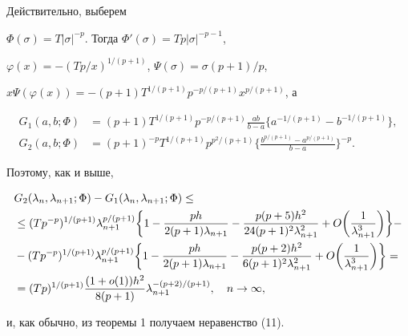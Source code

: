 Действительно, выберем


$\Phi(\sigma)=T|\sigma|^{-p}$. Тогда $\Phi'(\sigma)=Tp|\sigma|^{-p-1}$,


$\varphi(x)=-(Tp/x)^{1/(p+1)}$, $\Psi(\sigma)=\sigma(p+1)/p$, 


$x\Psi(\varphi(x))=-(p+1)T^{1/(p+1)}p^{-p/(p+1)}x^{p/(p+1)}$, а


\begin{align*}


G_1(a,b;\Phi)&=(p+1)T^{1/(p+1)}p^{-p/(p+1)}\frac{ab}{b-a}


\{a^{-1/(p+1)}-b^{-1/(p+1)}\},\\


G_2(a,b;\Phi)&=(p+1)^{-p}T^{1/(p+1)}p^{p^2/(p+1)}


\bigg\{\frac{b^{p/(p+1)}-a^{p/(p+1)}}{b-a}\bigg\}^{-p}.


\end{align*}


Поэтому, как и выше,


\begin{align}




&G_2(\lambda_n,\lambda_{n+1};\Phi)-


G_1(\lambda_n,\lambda_{n+1};\Phi)\le\notag\\


&\le (Tp^{-p})^{1/(p+1)}\lambda_{n+1}^{p/(p+1)}


\bigg\{1-\frac{ph}{2(p+1)\lambda_{n+1}}-


\frac{p(p+5)h^2}{24(p+1)^2\lambda_{n+1}^2}+


O\bigg(\frac{1}{\lambda_{n+1}^3}\bigg)\bigg\}-\notag\\


&-(Tp^{-p})^{1/(p+1)}\lambda_{n+1}^{p/(p+1)}


\bigg\{1-\frac{ph}{2(p+1)\lambda_{n+1}}-


\frac{p(p+2)h^2}{6(p+1)^2\lambda_{n+1}^2}+


O\bigg(\frac{1}{\lambda_{n+1}^3}\bigg)\bigg\}=\notag\\


&=(Tp)^{1/(p+1)}\frac{(1+o(1))h^2}{8(p+1)}\lambda_{n+1}^{-(p+2)/(p+1)},


\quad n\to\infty,


\end{align}


и, как обычно, из теоремы 1 получаем неравенство (11). 





